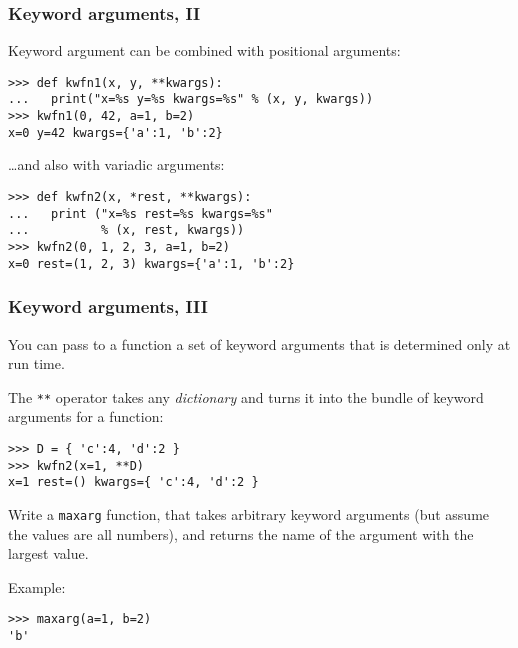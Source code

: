 \begin{frame}
  \frametitle{Keyword arguments, II}
  Keyword argument can be combined with positional arguments:
\begin{lstlisting}
>>> def kwfn1(x, y, **kwargs):
...   print("x=%s y=%s kwargs=%s" % (x, y, kwargs))
>>> kwfn1(0, 42, a=1, b=2)
x=0 y=42 kwargs={'a':1, 'b':2}
\end{lstlisting}

  \+
  \ldots and also with variadic arguments:
\begin{lstlisting}
>>> def kwfn2(x, *rest, **kwargs):
...   print ("x=%s rest=%s kwargs=%s"
...          % (x, rest, kwargs))
>>> kwfn2(0, 1, 2, 3, a=1, b=2)
x=0 rest=(1, 2, 3) kwargs={'a':1, 'b':2}
\end{lstlisting}
\end{frame}


\begin{frame}
  \frametitle{Keyword arguments, III}
  You can pass to a function a set of keyword arguments that is
  determined only at run time.

  The \texttt{**} operator takes any \emph{dictionary} and turns it
  into the bundle of keyword arguments for a function:
\begin{lstlisting}
>>> D = { 'c':4, 'd':2 }
>>> kwfn2(x=1, **D)
x=1 rest=() kwargs={ 'c':4, 'd':2 }
\end{lstlisting}
\end{frame}


\begin{frame}[fragile]
  \begin{exercise}
    Write a \texttt{maxarg} function, that takes arbitrary keyword
    arguments (but assume the values are all numbers), and returns the
    name of the argument with the largest value.

    \+
    Example:
\begin{lstlisting}
>>> maxarg(a=1, b=2)
'b'
\end{lstlisting}
  \end{exercise}
\end{frame}


